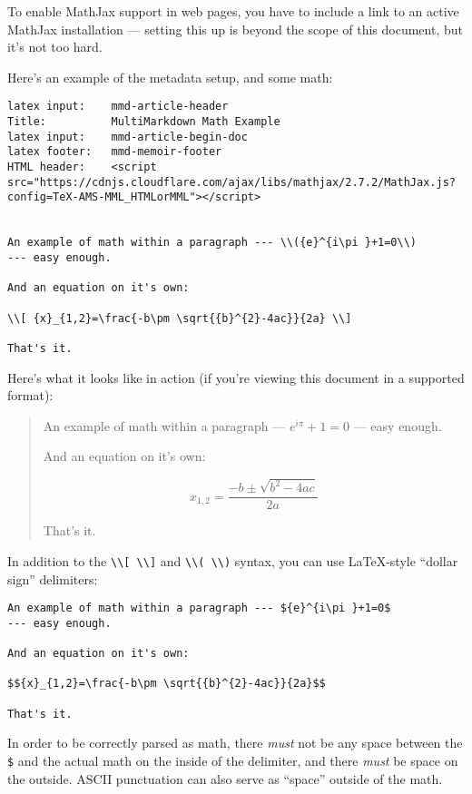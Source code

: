 To enable MathJax support in web pages, you have to include a link to an
active MathJax installation --- setting this up is beyond the scope of this
document, but it's not too hard.

Here's an example of the metadata setup, and some math:

\begin{verbatim}
latex input:	mmd-article-header  
Title:			MultiMarkdown Math Example  
latex input:	mmd-article-begin-doc  
latex footer:	mmd-memoir-footer  
HTML header:	<script src="https://cdnjs.cloudflare.com/ajax/libs/mathjax/2.7.2/MathJax.js?config=TeX-AMS-MML_HTMLorMML"></script>

		
An example of math within a paragraph --- \\({e}^{i\pi }+1=0\\)
--- easy enough.

And an equation on it's own:

\\[ {x}_{1,2}=\frac{-b\pm \sqrt{{b}^{2}-4ac}}{2a} \\]

That's it.
\end{verbatim}

Here's what it looks like in action (if you're viewing this document in a
supported format):

\begin{quote}
An example of math within a paragraph --- \({e}^{i\pi }+1=0\)
--- easy enough.

And an equation on it's own:

\[ {x}_{1,2}=\frac{-b\pm \sqrt{{b}^{2}-4ac}}{2a} \]

That's it.
\end{quote}

In addition to the \texttt{\textbackslash{}\textbackslash{}[ \textbackslash{}\textbackslash{}]} and \texttt{\textbackslash{}\textbackslash{}( \textbackslash{}\textbackslash{})} syntax, you can use LaTeX-style ``dollar sign'' delimiters:

\begin{verbatim}
An example of math within a paragraph --- ${e}^{i\pi }+1=0$
--- easy enough.

And an equation on it's own:

$${x}_{1,2}=\frac{-b\pm \sqrt{{b}^{2}-4ac}}{2a}$$

That's it.
\end{verbatim}

In order to be correctly parsed as math, there \emph{must} not be any space between the \texttt{\$} and the actual math on the inside of the delimiter, and there \emph{must} be space on the outside. ASCII punctuation can also serve as ``space'' outside of the math.

